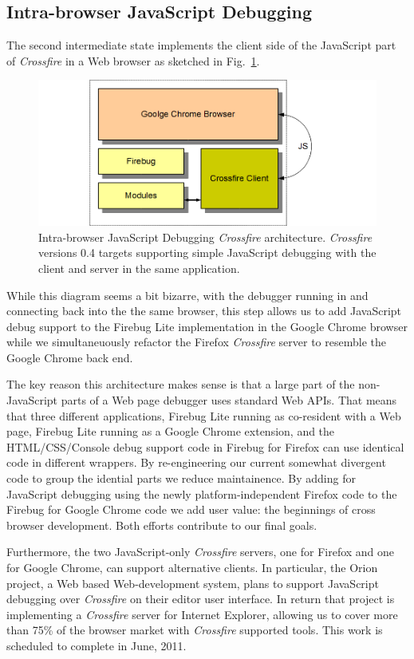 \subsection{Intra-browser JavaScript Debugging}
The second intermediate state implements the client side of the JavaScript part of \textit{Crossfire} in
a Web browser as sketched in Fig.~\ref{fig:fbugChrome}.
\begin{figure}[htp]
  \includegraphics  [width = 86 mm] {figures/fbugChrome.png}
  \caption{Intra-browser JavaScript Debugging \textit{Crossfire} architecture.
\textit{Crossfire} versions 0.4 targets supporting simple JavaScript debugging with the client and server in the same application.}
 \label{fig:fbugChrome}
\end{figure}
While this diagram seems a bit bizarre, with the
debugger running in and connecting back into the the same browser, this step allows us to add JavaScript debug
support to the Firebug Lite implementation in the Google Chrome browser while we simultaneuously refactor
the Firefox  \textit{Crossfire} server to resemble the Google Chrome back end.

The key reason this architecture makes sense is that a large part of the non-JavaScript parts of a Web page
debugger uses standard Web APIs. That  means that three different applications, Firebug Lite running as co-resident with a Web page,
Firebug Lite running as a Google Chrome extension,  and the HTML/CSS/Console debug support code in Firebug
for Firefox can use identical code in different wrappers. By re-engineering our current somewhat divergent code
to group the idential parts we reduce maintainence. By adding for JavaScript debugging using the newly platform-independent Firefox code to the Firebug for Google Chrome code we add user value: the beginnings of cross browser development. Both efforts contribute to our final goals.

Furthermore, the two JavaScript-only \textit{Crossfire} servers, one for Firefox and one for Google Chrome, can support
alternative clients. In particular, the Orion project, a Web based Web-development system, plans to support
JavaScript debugging over \textit{Crossfire} on their editor user interface. In
return that project is implementing a \textit{Crossfire} server for Internet Explorer, allowing us to cover more than 75\% of the browser market with \textit{Crossfire} supported tools.
This work is scheduled to complete in June, 2011.

